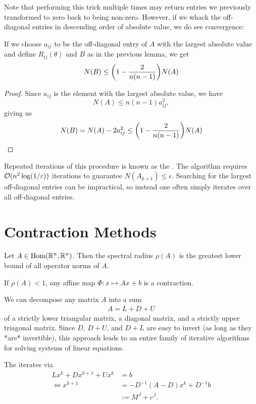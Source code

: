 Note that performing this trick multiple times may return entries we previously transformed to zero back to being non-zero. However, if we whack the off-diagonal entries in descending order of absolute value, we do see convergence:
\begin{theorem}
	If we choose $a_{ij}$ to be the off-diagonal entry of $A$ with the largest absolute value and define $R_{ij}(\theta)$ and $B$ as in the previous lemma, we get
	\begin{align*}
		N(B) \leq \qty(1 - \frac{2}{n(n-1)})N(A)
	\end{align*}
\end{theorem}
\begin{proof}
	Since $a_{ij}$ is the element with the largest absolute value, we have $$N(A) \leq n(n-1)a_{ij}^2,$$ giving us
	\begin{align*}
		N(B) = N(A) - 2a_{ij}^2 \leq \qty(1 - \frac{2}{n(n-1)})N(A)
	\end{align*}
\end{proof}
Repeated iterations of this procedure is known as the . The algorithm requires $\mathcal{O}(n^2 \log(1/\varepsilon))$ iterations to guarantee $N(A_{k+1}) \leq \epsilon$. Searching for the largest off-diagonal entries can be impractical, so instead one often simply iterates over all off-diagonal entries.
\section{Contraction Methods}
\begin{theorem}
	Let $A \in \textnormal{Hom}(\mathbb{R}^n, \mathbb{R}^n)$. Then the spectral radius $\rho(A)$ is the greatest lower bound of all operator norms of $A$.
\end{theorem}
\begin{corollary}
	If $\rho(A) < 1$, any affine map $\Phi : x \mapsto Ax + b$ is a contraction.
\end{corollary}
We can decompose any matrix $A$ into a sum
\begin{align*}
	A = L + D + U
\end{align*}
of a strictly lower triangular matrix, a diagonal matrix, and a strictly upper triagonal matrix. Since $D$, $D+U$, and $D+L$ are easy to invert (as long as they *are* invertible), this approach leads to an entire family of iterative algorithms for solving systems of linear equations.

The  iterates via
\begin{align*}
	Lx^k + Dx^{k+1} + Ux^k &= b\\
	\Leftrightarrow x^{k+1} &= -D^{-1}(A - D)x^k + D^{-1}b\\
	&:= M^J + c^J.
\end{align*}

